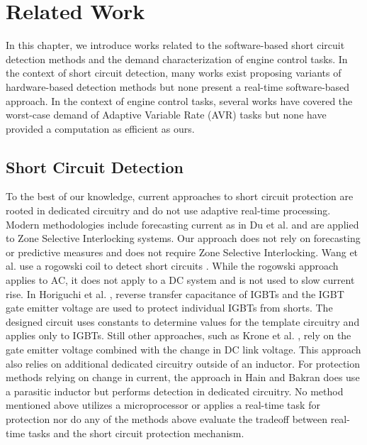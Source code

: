 \section{Related Work}   \label{chap:relatedWork}

In this chapter, we introduce works related to the software-based short circuit detection methods and the demand characterization of engine control tasks.
In the context of short circuit detection, many works exist proposing variants of hardware-based detection methods but none present a real-time software-based approach.
In the context of engine control tasks, several works have covered the worst-case demand of Adaptive Variable Rate (AVR) tasks but none have provided a computation as efficient as ours.

\subsection{Short Circuit Detection} \label{subsec:scd-relatedWork}

To the best of our knowledge, current approaches to short circuit protection are rooted in dedicated circuitry and do not use adaptive real-time processing.
Modern methodologies include forecasting current as in Du et al. \cite{du_new_2014} and are applied to Zone Selective Interlocking systems.
Our approach does not rely on forecasting or predictive measures and does not require Zone Selective Interlocking.
Wang et al. use a rogowski coil to detect short circuits \cite{wang_new_2011}.
While the rogowski approach applies to AC, it does not apply to a DC system and is not used to slow current rise.
In Horiguchi et al. \cite{horiguchi_short_2014} \cite{horiguchi_high-speed_2015}, reverse transfer capacitance of IGBTs and the IGBT gate emitter voltage are used to protect individual IGBTs from shorts.
The designed circuit uses constants to determine values for the template circuitry and applies only to IGBTs.
Still other approaches, such as Krone et al. \cite{krone_fast_2015}, rely on the gate emitter voltage combined with the change in DC link voltage.
This approach also relies on additional dedicated circuitry outside of an inductor.
For protection methods relying on change in current, the approach in Hain and Bakran \cite{hain_new_2016} does use a parasitic inductor but performs detection in dedicated circuitry.
No method mentioned above utilizes a microprocessor or applies a real-time task for protection nor do any of the methods above evaluate the tradeoff between real-time tasks and the short circuit protection mechanism.


